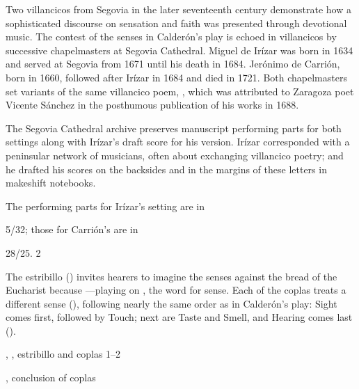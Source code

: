 Two villancicos from Segovia in the later seventeenth century demonstrate how a sophisticated discourse on sensation and faith was presented through devotional music.
The contest of the senses in Calderón's play is echoed in villancicos by successive chapelmasters at Segovia Cathedral.
Miguel de Irízar was born in 1634 and served at Segovia from 1671 until his death in 1684.
Jerónimo de Carrión, born in 1660, followed after Irízar in 1684 and died in 1721.
Both chapelmasters set variants of the same villancico poem, , which was attributed to Zaragoza poet Vicente Sánchez in the posthumous publication of his works in 1688.

The Segovia Cathedral archive preserves manuscript performing parts for both settings along with Irízar's draft score for his version.
Irízar corresponded with a peninsular network of musicians, often about exchanging villancico poetry; and he drafted his scores on the backsides and in the margins of these letters in makeshift notebooks.
\begin{Footnote}
  The performing parts for Irízar's setting are in \signature{E-SE}{5/32}; those for Carrión's are in \signature{E-SE}{28/25}.
2\end{Footnote}

The estribillo () invites hearers to imagine the senses  against the bread of the Eucharist because ---playing on , the word for sense.
Each of the coplas treats a different sense (), following nearly the same order as in Calderón's play: 
Sight comes first, followed by Touch; next are Taste and Smell, and Hearing comes last ().

\begin{expoem}
  \caption{, , estribillo and coplas 1--2}
  \label{expoem:Si_los_sentidos-Sanchez-estribillo}
\end{expoem}
\begin{expoem}
  \caption{, conclusion of coplas}
  \label{expoem:Si_los_sentidos-Sanchez-coplas}
\end{expoem}



